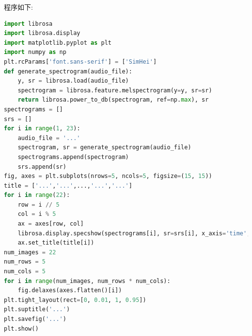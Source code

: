 \documentclass[lang=cn]{elegantpaper}
\begin{document}
程序如下:
\begin{lstlisting}[language=Python]
import librosa
import librosa.display
import matplotlib.pyplot as plt
import numpy as np
plt.rcParams['font.sans-serif'] = ['SimHei']
def generate_spectrogram(audio_file):
    y, sr = librosa.load(audio_file)
    spectrogram = librosa.feature.melspectrogram(y=y, sr=sr)
    return librosa.power_to_db(spectrogram, ref=np.max), sr
spectrograms = []
srs = []
for i in range(1, 23):
    audio_file = '...'
    spectrogram, sr = generate_spectrogram(audio_file)
    spectrograms.append(spectrogram)
    srs.append(sr)
fig, axes = plt.subplots(nrows=5, ncols=5, figsize=(15, 15))
title = ['...','...',...,'...','...']
for i in range(22):
    row = i // 5
    col = i % 5
    ax = axes[row, col]
    librosa.display.specshow(spectrograms[i], sr=srs[i], x_axis='time', y_axis='mel', ax=ax)
    ax.set_title(title[i])
num_images = 22
num_rows = 5
num_cols = 5
for i in range(num_images, num_rows * num_cols):
    fig.delaxes(axes.flatten()[i])
plt.tight_layout(rect=[0, 0.01, 1, 0.95])
plt.suptitle('...')
plt.savefig('...')
plt.show()
\end{lstlisting}
\end{document}
